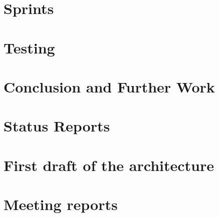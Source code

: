 \documentclass[11pt,a4paper,twoside]{report}
\begin{document}
\cleardoublepage
\chapter{Sprints}\label{ch:sprints}


\cleardoublepage
\chapter{Testing}\label{ch:systest}


\cleardoublepage
\chapter{Conclusion and Further Work}\label{ch:conclusion}




\printglossary

\appendix
\appendixpage
\addappheadtotoc

\cleardoublepage
\chapter{Status Reports}\label{app:statusreports}


\cleardoublepage
\chapter{First draft of the architecture}\label{app:firstdraftarchi}


\cleardoublepage
\chapter{Meeting reports}\label{app:meetings}

\end{document}
